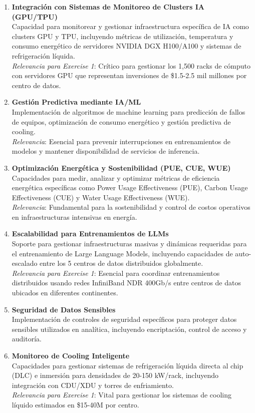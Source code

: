 \documentclass[12pt,a4paper]{article}
\begin{document}
\begin{enumerate}
    \item \textbf{Integración con Sistemas de Monitoreo de Clusters IA (GPU/TPU)}\\
    Capacidad para monitorear y gestionar infraestructura específica de IA como clusters GPU y TPU, incluyendo métricas de utilización, temperatura y consumo energético de servidores NVIDIA DGX H100/A100 y sistemas de refrigeración líquida.\\
    \textit{Relevancia para Exercise 1}: Crítico para gestionar los 1,500 racks de cómputo con servidores GPU que representan inversiones de \$1.5-2.5 mil millones por centro de datos.

    \item \textbf{Gestión Predictiva mediante IA/ML}\\
    Implementación de algoritmos de machine learning para predicción de fallos de equipos, optimización de consumo energético y gestión predictiva de cooling.\\
    \textit{Relevancia}: Esencial para prevenir interrupciones en entrenamientos de modelos y mantener disponibilidad de servicios de inferencia.

    \item \textbf{Optimización Energética y Sostenibilidad (PUE, CUE, WUE)}\\
    Capacidades para medir, analizar y optimizar métricas de eficiencia energética específicas como Power Usage Effectiveness (PUE), Carbon Usage Effectiveness (CUE) y Water Usage Effectiveness (WUE).\\
    \textit{Relevancia}: Fundamental para la sostenibilidad y control de costos operativos en infraestructuras intensivas en energía.

    \item \textbf{Escalabilidad para Entrenamientos de LLMs}\\
    Soporte para gestionar infraestructuras masivas y dinámicas requeridas para el entrenamiento de Large Language Models, incluyendo capacidades de auto-escalado entre los 5 centros de datos distribuidos globalmente.\\
    \textit{Relevancia para Exercise 1}: Esencial para coordinar entrenamientos distribuidos usando redes InfiniBand NDR 400Gb/s entre centros de datos ubicados en diferentes continentes.

    \item \textbf{Seguridad de Datos Sensibles}\\
    Implementación de controles de seguridad específicos para proteger datos sensibles utilizados en analítica, incluyendo encriptación, control de acceso y auditoría.

    \item \textbf{Monitoreo de Cooling Inteligente}\\
    Capacidades para gestionar sistemas de refrigeración líquida directa al chip (DLC) e inmersión para densidades de 20-150 kW/rack, incluyendo integración con CDU/XDU y torres de enfriamiento.\\
    \textit{Relevancia para Exercise 1}: Vital para gestionar los sistemas de cooling líquido estimados en \$15-40M por centro.
\end{enumerate}
\end{document}
